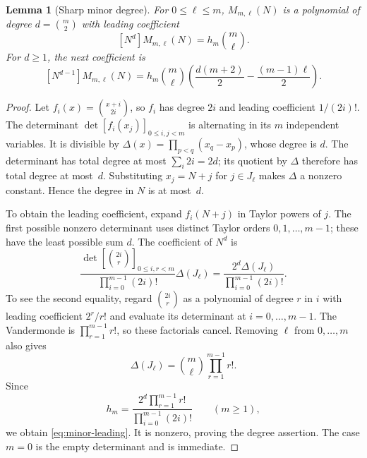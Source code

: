 \documentclass[11pt,a4paper]{article}
\numberwithin{equation}{section}
\newtheorem{lemma}[theorem]{Lemma}
\theoremstyle{definition}
\theoremstyle{remark}
\begin{document}
\begin{lemma}[Sharp minor degree]\label{lem:minor-degree}
For $0\leq\ell\leq m$, $M_{m,\ell}(N)$ is a polynomial of degree
$d=\binom m2$ with leading coefficient
\begin{equation}\label{eq:minor-leading}
 [N^d]M_{m,\ell}(N)=h_m\binom m\ell.
\end{equation}
For $d\geq1$, the next coefficient is
\begin{equation}\label{eq:minor-subleading}
 [N^{d-1}]M_{m,\ell}(N)
 =h_m\binom m\ell
   \left(\frac{d(m+2)}2-\frac{(m-1)\ell}{2}\right).
\end{equation}
\end{lemma}
\begin{proof}
Let $f_i(x)=\binom{x+i}{2i}$, so $f_i$ has degree $2i$ and leading
coefficient $1/(2i)!$.  The determinant $\det[f_i(x_j)]_{0\leq i,j<m}$
is alternating in its $m$ independent variables.  It is divisible by
$\Delta(x)=\prod_{p<q}(x_q-x_p)$, whose degree is $d$.  The determinant
has total degree at most $\sum_i2i=2d$; its quotient by $\Delta$ therefore
has total degree at most~$d$.  Substituting $x_j=N+j$ for
$j\in J_\ell$ makes $\Delta$ a nonzero constant.  Hence the degree in
$N$ is at most~$d$.

To obtain the leading coefficient, expand $f_i(N+j)$ in Taylor
powers of $j$.  The first possible nonzero determinant uses distinct
Taylor orders $0,1,\ldots,m-1$; these have the least possible sum $d$.
The coefficient of $N^d$ is
\begin{equation}\label{eq:Taylorleading}
 \frac{\det[\binom{2i}{r}]_{0\leq i,r<m}}{\prod_{i=0}^{m-1}(2i)!}
       \Delta(J_\ell)
 =\frac{2^d\Delta(J_\ell)}{\prod_{i=0}^{m-1}(2i)!}.
\end{equation}
To see the second equality, regard $\binom{2i}{r}$ as a polynomial
of degree $r$ in $i$ with leading coefficient $2^r/r!$ and evaluate
its determinant at $i=0,\ldots,m-1$.  The Vandermonde is
$\prod_{r=1}^{m-1}r!$, so these factorials cancel.
Removing $\ell$ from $0,\ldots,m$ also gives
\begin{equation}\label{eq:deletedVand}
 \Delta(J_\ell)=\binom m\ell\prod_{r=1}^{m-1}r!.
\end{equation}
Since
\[
 h_m=\frac{2^d\prod_{r=1}^{m-1}r!}{\prod_{i=0}^{m-1}(2i)!}
 \qquad(m\geq1),
\]
we obtain \eqref{eq:minor-leading}.  It is nonzero, proving the degree
assertion.  The case $m=0$ is the empty determinant and is immediate.


\end{proof}
\end{document}

